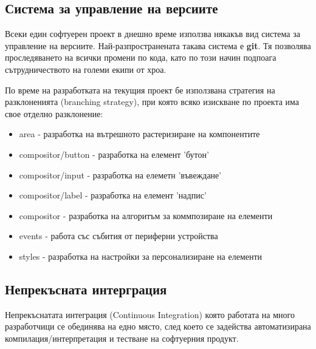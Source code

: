         \subsection{Система за управление на версиите}

                Всеки един софтуерен проект в днешно време използва някакъв вид
                система за управление на версиите. Най-разпространената такава
                система е \textbf{git}. Тя позволява проследяването на всички 
                промени по кода, като по този начин подпоага сътрудничеството 
                на големи екипи от хроа.

                По време на разработката на текущия проект бе използвана
                стратегия на разклоненията (branching strategy), при която 
                всяко изискване по проекта има свое отделно разклонение:

                \begin{itemize}
                        \item area - разработка на вътрешното растеризиране 
                                на компонентите
                        \item compositor/button - разработка на елемент 
                                'бутон'
                        \item compositor/input - разработка на елеметн 
                                'въвеждане'
                        \item compositor/label - разработка на елемент 
                                'надпис'
                        \item compositor - разработка на алгоритъм за
                                коммпозиране на елементи
                        \item events - работа със събития от периферни 
                                устройства
                        \item styles - разработка на настройки за 
                                персонализиране на елементи
                \end{itemize}

        \subsection{Непрекъсната интерграция}

                Непрекъснатата интеграция (Continuous Integration) 
                която работата на много разработчици се обединява на едно 
                място, след което се задейства автоматизирана 
                компилация/интерпретация и тестване на софтуерния продукт.


